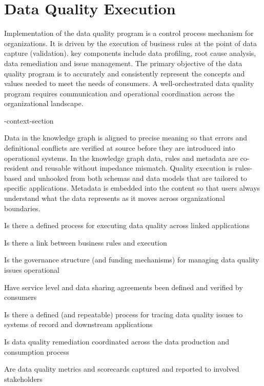 \section{Data Quality Execution}\label{sec:ekgmm-b-3-3} %

Implementation of the data quality program is a control process mechanism for organizations.
It is driven by the execution of business rules at the point of data capture (validation).
key components include data profiling, root cause analysis, data remediation and issue management.
The primary objective of the data quality program is to accurately and consistently represent the concepts and
values needed to meet the needs of consumers.
A well-orchestrated data quality program requires communication and operational coordination across the
organizational landscape.

\ekgmm-context-section

Data in the knowledge graph is aligned to precise meaning so that errors and definitional conflicts are
verified at source before they are introduced into operational systems.
In the knowledge graph data, rules and metadata are co-resident and reusable without impedance mismatch.
Quality execution is rules-based and unhooked from both schemas and data models that are tailored to
specific applications.
Metadata is embedded into the content so that users always understand what the data represents as it moves across
organizational boundaries.

\kgmmcorequestionssection

\begin{core-questions}

  \item [\thesection.1] Is there a defined process for executing data quality across linked applications
  \item [\thesection.1] Is there a link between business rules and execution
  \item [\thesection.1] Is the governance structure (and funding mechanisms) for managing data quality issues
                        operational
  \item [\thesection.1] Have service level and data sharing agreements been defined and verified by consumers
  \item [\thesection.1] Is there a defined (and repeatable) process for tracing data quality issues to
                        systems of record and downstream applications
  \item [\thesection.1] Is data quality remediation coordinated across the data production and consumption process
  \item [\thesection.1] Are data quality metrics and scorecards captured and reported to involved stakeholders

\end{core-questions}

